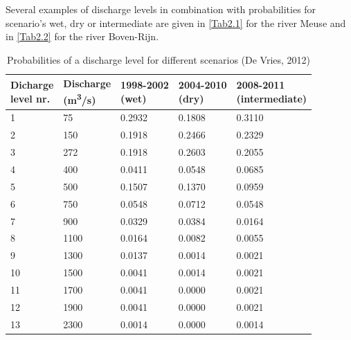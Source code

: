 Several examples of discharge levels in combination with probabilities for scenario's wet, dry or intermediate are given in \autoref{Tab2.1} for the river Meuse and in \autoref{Tab2.2} for the river Boven-Rijn.

\begin{table}[h]
\center
\begin{tabular}{p{2cm}p{2cm}p{2cm}p{2cm}p{2.5cm}}
\makecell[l]{Dicharge\\level nr.} & \makecell[l]{Discharge\\(m\textsuperscript{3}/s)} &\makecell[l]{1998-2002\\(wet)} & \makecell[l]{2004-2010\\(dry)} & \makecell[l]{2008-2011\\(intermediate)} \\ \hline
1 & 75 & 0.2932 & 0.1808 & 0.3110 \\
2 & 150 & 0.1918 & 0.2466 & 0.2329 \\
3 & 272 & 0.1918 & 0.2603 & 0.2055 \\
4 & 400 & 0.0411 & 0.0548 & 0.0685 \\
5 & 500 & 0.1507 & 0.1370 & 0.0959 \\
6 & 750 & 0.0548 & 0.0712 & 0.0548 \\
7 & 900 & 0.0329 & 0.0384 & 0.0164 \\
8 & 1100 & 0.0164 & 0.0082 & 0.0055 \\
9 & 1300 & 0.0137 & 0.0014 & 0.0021 \\
10 & 1500 & 0.0041 & 0.0014 & 0.0021 \\
11 & 1700 & 0.0041 & 0.0000 & 0.0021 \\
12 & 1900 & 0.0041 & 0.0000 & 0.0021 \\
13 & 2300 & 0.0014 & 0.0000 & 0.0014 \\ \hline
\end{tabular}
\caption{Probabilities of a discharge level for different scenarios (De Vries, 2012)}
\label{Tab2.1}
\end{table}

